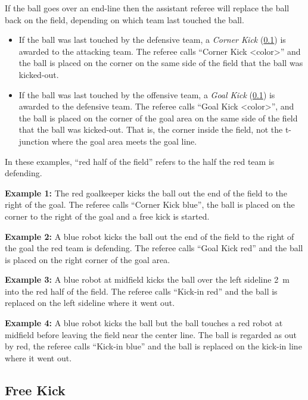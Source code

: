 If the ball goes over an end-line then the assistant referee will replace the ball back on the field, depending on which team last touched the ball.

\begin{itemize}
  \item If the ball was last touched by the defensive team, a \emph{Corner Kick} (\cf \cref{sec:free_kick}) is awarded to the attacking team. The referee calls ``Corner Kick \textless color\textgreater'' and the ball is placed on the corner on the same side of the field that the ball was kicked-out.
  \item If the ball was last touched by the offensive team, a \emph{Goal Kick} (\cf \cref{sec:free_kick}) is awarded to the defensive team. The referee calls ``Goal Kick \textless color\textgreater'', and the ball is placed on the corner of the goal area on the same side of the field that the ball was kicked-out. That is, the corner inside the field, not the t-junction where the goal area meets the goal line.
\end{itemize}

In these examples, ``red half of the field'' refers to the half the red team is defending.

  \textbf{Example 1:} The red goalkeeper kicks the ball out the end of the field to the right of the goal. The referee calls ``Corner Kick blue'', the ball is placed on the corner to the right of the goal and a free kick is started.

  \textbf{Example 2:} A blue robot kicks the ball out the end of the field to the right of the goal the red team is defending. The referee calls ``Goal Kick red'' and the ball is placed on the right corner of the goal area.

  \textbf{Example 3:} A blue robot at midfield kicks the ball over the left sideline \qty{2}{\metre} into the red half of the field. The referee calls ``Kick-in red'' and the ball is replaced on the left sideline where it went out.

  \textbf{Example 4:} A blue robot kicks the ball but the ball touches a red robot at midfield before leaving the field near the center line. The ball is regarded as out by red, the referee calls ``Kick-in blue'' and the ball is replaced on the kick-in line where it went out.

\subsection{Free Kick}
\label{sec:free_kick}

